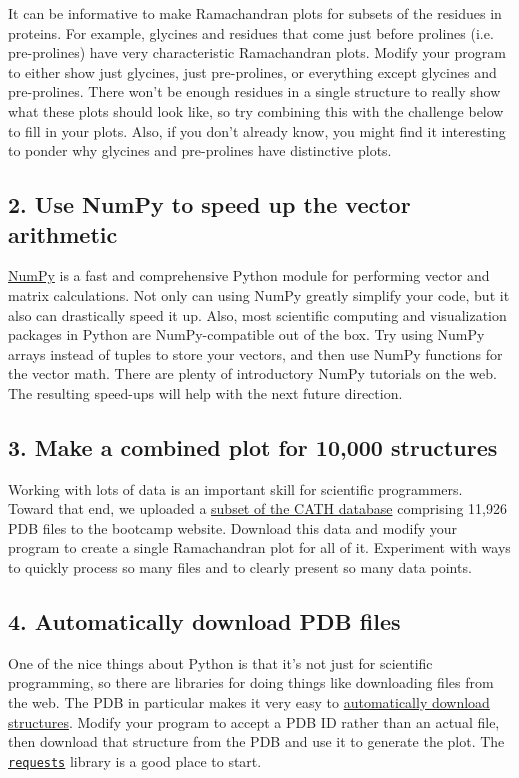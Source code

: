 \documentclass{article}
\newcommand{\module}[2]{\href{#2}{\texttt{#1}}}
\begin{document}
It can be informative to make Ramachandran plots for subsets of the residues in 
proteins.  For example, glycines and residues that come just before prolines 
(i.e. pre-prolines) have very characteristic Ramachandran plots.  Modify your 
program to either show just glycines, just pre-prolines, or everything except 
glycines and pre-prolines.  There won't be enough residues in a single 
structure to really show what these plots should look like, so try combining 
this with the challenge below to fill in your plots.  Also, if you don't 
already know, you might find it interesting to ponder why glycines and 
pre-prolines have distinctive plots.

\subsection{2. Use NumPy to speed up the vector arithmetic}

\href{http://www.numpy.org/}{NumPy} is a fast and comprehensive Python module for performing vector and matrix
calculations. Not only can using NumPy greatly simplify your code, but it also
can drastically speed it up. Also, most scientific computing and visualization packages
in Python are NumPy-compatible out of the box. Try using NumPy arrays instead of tuples
to store your vectors, and then use NumPy functions for the vector math. There are
plenty of introductory NumPy tutorials on the web. The resulting speed-ups will help
with the next future direction.

\subsection{3. Make a combined plot for 10,000 structures}

Working with lots of data is an important skill for scientific programmers.  
Toward that end, we uploaded a 
\href{ftp://ftp.biochem.ucl.ac.uk/pub/cath/v3_5_0/CathDomainPdb.S35.v3.5.0.tgz}{subset 
of the CATH database} comprising 11,926 PDB files to the bootcamp website.  
Download this data and modify your program to create a single Ramachandran plot 
for all of it.  Experiment with ways to quickly process so many files and to 
clearly present so many data points.

\subsection{4. Automatically download PDB files}

One of the nice things about Python is that it's not just for scientific 
programming, so there are libraries for doing things like downloading files 
from the web.  The PDB in particular makes it very easy to 
\href{http://www.rcsb.org/pdb/software/rest.do#search}{automatically download 
structures}.  Modify your program to accept a PDB ID rather than an actual 
file, then download that structure from the PDB and use it to generate the 
plot.  The \module{requests}{http://docs.python-requests.org} library is a good 
place to start.
\end{document}
